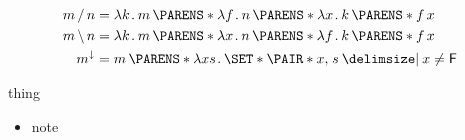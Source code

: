 \documentclass[10pt,fleqn]{article}
\begin{document}
\setlength\abovedisplayskip{0pt}
\setlength\belowdisplayskip{0pt}
\setlength\abovedisplayshortskip{0pt}
\setlength\belowdisplayshortskip{0pt}


\begin{minipage}{0.3\textwidth}
\begin{spreadlines}{0pt}
\begin{align*}
  m \fsl n &=
  \l k \dt m\,\p{\l f \dt n\,\p{\l x \dt k\,\p{f\,x}}} \\
  m \bsl n &=
  \l k \dt m\,\p{\l x \dt n\,\p{\l f \dt k\,\p{f\,x}}} \\
  m^\downarrow &=
  m\,\p{\l xs \dt \set{\pair{x}{s} \giv x \neq \cn{F}}}
\end{align*}
\end{spreadlines}
\end{minipage}
%
%
\begin{minipage}{0.3\textwidth}
\begin{spreadlines}{0pt}
thing
\end{spreadlines}
\end{minipage}
%
%
\begin{minipage}{0.4\textwidth}
\begin{spreadlines}{0pt}
\begin{itemize}
  \item
    note
\end{itemize}
\end{spreadlines}
\end{minipage}

\dotfill
\end{document}
